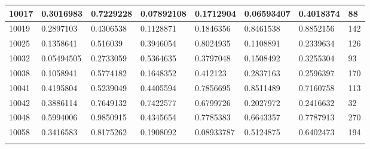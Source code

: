 \begin{anexosenv}
\begin{table}[H]
{\begin{tabular}{|l|l|l|l|l|l|l|l|}
						10017 & 0.3016983 & 0.7229228 & 0.07892108 & 0.1712904 & 0.06593407 & 0.4018374 & 88 \\ \hline
						10019 & 0.2897103 & 0.4306538 & 0.1128871 & 0.1846356 & 0.8461538 & 0.8852156 & 142 \\ \hline
						10025 & 0.1358641 & 0.516039 & 0.3946054 & 0.8024935 & 0.1108891 & 0.2339634 & 126 \\ \hline
						10032 & 0.05494505 & 0.2733059 & 0.5364635 & 0.3797048 & 0.1508492 & 0.3255304 & 93 \\ \hline
						10038 & 0.1058941 & 0.5774182 & 0.1648352 & 0.412123 & 0.2837163 & 0.2596397 & 170 \\ \hline
						10041 & 0.4195804 & 0.5239049 & 0.4405594 & 0.7856695 & 0.8511489 & 0.7160758 & 113 \\ \hline
						10042 & 0.3886114 & 0.7649132 & 0.7422577 & 0.6799726 & 0.2027972 & 0.2416632 & 32 \\ \hline
						10048 & 0.5994006 & 0.9850915 & 0.4345654 & 0.7785383 & 0.6643357 & 0.7787913 & 270 \\ \hline
						10058 & 0.3416583 & 0.8175262 & 0.1908092 & 0.08933787 & 0.5124875 & 0.6402473 & 194 \\ \hline
                   
\label{tab:nosocssemrotacaoI}
\end{tabular}
}
\end{table}


\end{anexosenv}
